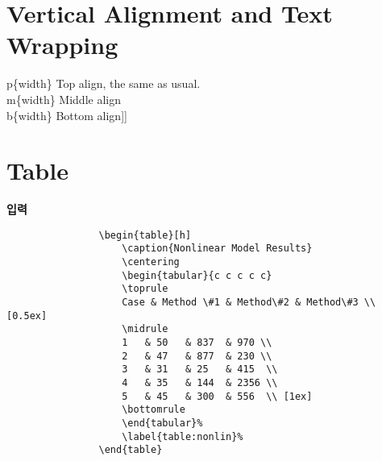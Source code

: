 \newpage  
\section{Vertical Alignment and Text Wrapping}
\null


			p\{width\} Top align, the same as usual.\\
			m\{width\} Middle align\\
			b\{width\} Bottom align]]
























\newpage  
\section{Table}
\null

	\textbf{입력}
		\begin{minipage}[t]{0.5\textwidth}
		\singlespacing
		\begin{verbatim}
				\begin{table}[h]
					\caption{Nonlinear Model Results}
					\centering
					\begin{tabular}{c c c c c}
					\toprule
					Case & Method \#1 & Method\#2 & Method\#3 \\ [0.5ex]
					\midrule
					1   & 50   & 837  & 970 \\
					2   & 47   & 877  & 230 \\
					3   & 31   & 25   & 415  \\
					4   & 35   & 144  & 2356 \\
					5   & 45   & 300  & 556  \\ [1ex]
					\bottomrule
					\end{tabular}%
					\label{table:nonlin}%
				\end{table}
		\end{verbatim}
		\end{minipage}\\

